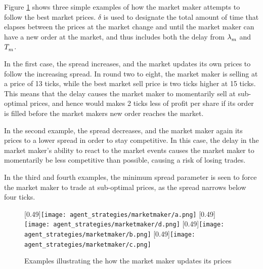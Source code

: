 Figure \ref{figure:marketmaker_strategy} shows three simple examples of how the market maker attempts to follow the best market prices. $\delta$ is used to designate the total amount of time that elapses between the prices at the market change and until the market maker can have a new order at the market, and thus includes both the delay from $\lambda_m^{}$ and $T_m^{}$. 

In the first case, the spread increases, and the market updates its own prices to follow the increasing spread. In round two to eight, the market maker is selling at a price of 13 ticks, while the best market sell price is two ticks higher at 15 ticks. This means that the delay causes the market maker to momentarily sell at sub-optimal prices, and hence would makes 2 ticks less of profit per share if its order is filled before the market makers new order reaches the market. 

In the second example, the spread decreases, and the market maker again its prices to a lower spread in order to stay competitive. In this case, the delay in the market maker's ability to react to the market events causes the market maker to momentarily be less competitive than possible, causing a risk of losing trades. 

In the third and fourth examples, the minimum spread parameter \ssmmminspreadagent{} is seen to force the market maker to trade at sub-optimal prices, as the spread narrows below four ticks.

\begin{figure}
\centering
\subcaptionbox{}
[0.49\linewidth]{\texttt{[image: agent\_strategies/marketmaker/a.png]}}
\subcaptionbox{}
[0.49\linewidth]{\texttt{[image: agent\_strategies/marketmaker/d.png]}}
\subcaptionbox{}
[0.49\linewidth]{\texttt{[image: agent\_strategies/marketmaker/b.png]}}
\subcaptionbox{}
[0.49\linewidth]{\texttt{[image: agent\_strategies/marketmaker/c.png]}}
\caption{Examples illustrating the how the market maker updates its prices}
\label{figure:marketmaker_strategy}
\end{figure}


